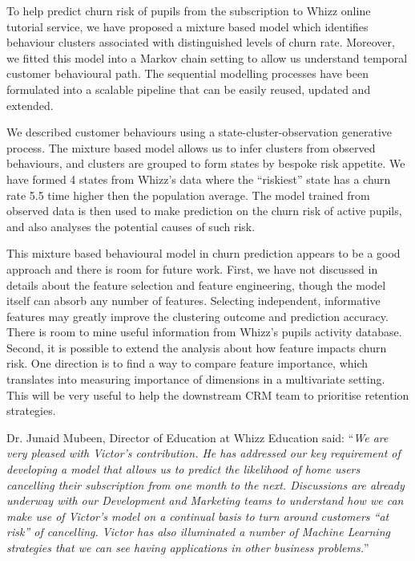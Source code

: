 \documentclass[english,a4,oneside,9pt]{extarticle}
\begin{document}
To help predict churn risk of pupils from the subscription to Whizz online tutorial service, we have proposed a mixture based model which identifies behaviour clusters associated with distinguished levels of churn rate. Moreover, we fitted this model into a Markov chain setting to allow us understand temporal customer behavioural path. The sequential modelling processes have been formulated into a scalable pipeline that can be easily reused, updated and extended.

We described customer behaviours using a state-cluster-observation generative process. The mixture based model allows us to infer clusters from observed behaviours, and clusters are grouped to form states by bespoke risk appetite. We have formed 4 states from Whizz's data where the ``riskiest'' state has a churn rate 5.5 time higher then the population average. The model trained from observed data is then used to make prediction on the churn risk of active pupils, and also analyses the potential causes of such risk.

This mixture based behavioural model in churn prediction appears to be a good approach and there is room for future work. First, we have not discussed in details about the feature selection and feature engineering, though the model itself can absorb any number of features. Selecting independent, informative features may greatly improve the clustering outcome and prediction accuracy. There is room to mine useful information from Whizz's pupils activity database. Second, it is possible to extend the analysis about how feature impacts churn risk. One direction is to find a way to compare feature importance, which translates into measuring importance of dimensions in a multivariate setting. This will be very useful to help the downstream CRM team to prioritise retention strategies.  

Dr. Junaid Mubeen, Director of Education at Whizz Education said: ``\emph{We are very pleased with Victor's contribution. He has addressed our key requirement of developing a model that allows us to predict the likelihood of home users cancelling their subscription from one month to the next. Discussions are already underway with our Development and Marketing teams to understand how we can make use of Victor's model on a continual basis to turn around customers ``at risk'' of cancelling. Victor has also illuminated a number of Machine Learning strategies that we can see having applications in other business problems.}''


%
\end{document}
